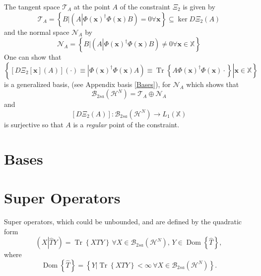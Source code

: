 \documentclass[aps,preprint]{revtex4}%
\begin{document}
The tangent space $\mathcal{T}_{A}$ at the point $A$ of the constraint
$\Xi_{2}$ is given by
\begin{equation}
\mathcal{T}_{A}=\left\{  \left.  B\right\vert \left(  A\left\vert \Phi\left(
\boldsymbol{x}\right)  ^{\dagger}\Phi\left(  \boldsymbol{x}\right)  \right.
B\right)  =0\forall\boldsymbol{x}\right\}  \subseteq\ker D\Xi_{2}\left(
A\right)
\end{equation}
and the normal space $\mathcal{N}_{A}$ by
\begin{equation}
\mathcal{N}_{A}=\left\{  \left.  B\right\vert \left(  A\left\vert \Phi\left(
\boldsymbol{x}\right)  ^{\dagger}\Phi\left(  \boldsymbol{x}\right)  \right.
B\right)  \neq0\forall\boldsymbol{x\in}\mathbb{X}\right\}
\end{equation}
One can show that $\left\{  \left.  \left[  D\Xi_{2}\left[  \boldsymbol{x}%
\right]  \left(  A\right)  \right]  \left(  \cdot\right)  \equiv\left\vert
\Phi\left(  \boldsymbol{x}\right)  ^{\dagger}\Phi\left(  \boldsymbol{x}%
\right)  A\right)  \equiv\operatorname{Tr}\left\{  A\Phi\left(  \boldsymbol{x}%
\right)  ^{\dagger}\Phi\left(  \boldsymbol{x}\right)  \cdot\right\}
\right\vert \boldsymbol{x\in}\mathbb{X}\right\}  $ is a generalized basis,
(see Appendix basis \ref{Bases}), for $\mathcal{N}_{A}$ which shows that
\begin{equation}
\mathcal{B}_{2sa}\left(  \mathcal{H}^{N}\right)  =\mathcal{T}_{A}%
\oplus\mathcal{N}_{A}%
\end{equation}
and
\begin{equation}
\left[  D\Xi_{2}\left(  A\right)  \right]  :\mathcal{B}_{2sa}\left(
\mathcal{H}^{N}\right)  \rightarrow L_{1}\left(  \mathbb{X}\right)
\end{equation}
is surjective so that $A$ is a \emph{regular }\cite{Hestenes}\emph{ }point of
the constraint.

\section{Bases \label{Bases}}

\section{Super Operators \label{super}}

Super operators, which could be unbounded, and are defined by the quadratic
form
\begin{equation}
\left(  X\left\vert \widehat{T}Y\right.  \right)  =\operatorname{Tr}\left\{
XTY\right\}  \,\forall X\in\mathcal{B}_{2sa}\left(  \mathcal{H}^{N}\right)
,\,Y\in\operatorname{Dom}\left\{  \widehat{T}\right\}  ,
\end{equation}
where
\[
\operatorname{Dom}\left\{  \widehat{T}\right\}  =\left\{  \left.  Y\right\vert
\operatorname{Tr}\left\{  XTY\right\}  <\infty\,\forall X\in\mathcal{B}%
_{2sa}\left(  \mathcal{H}^{N}\right)  \right\}  .
\]
\end{document}
